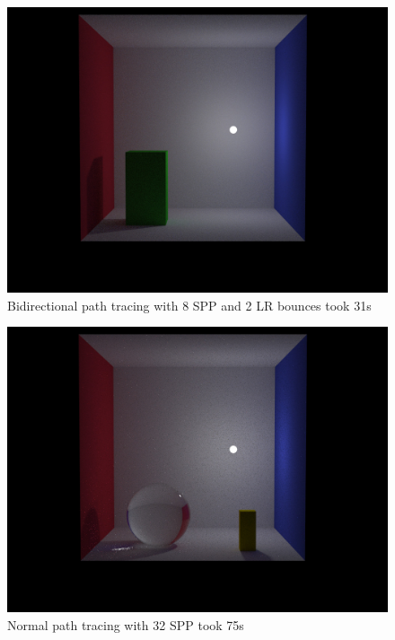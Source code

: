 \begin{figure}[htbp]
  \centering
     \includegraphics[width=\textwidth]{pics/1_bi_dir_pt_8spp_2lrb_31s.jpg}
  \caption{Bidirectional path tracing with 8 SPP and 2 LR bounces took 31s}
  \label{fig:comparison_1_bpt}
\end{figure}

\begin{figure}[htbp]
  \centering
     \includegraphics[width=\textwidth]{pics/2_normal_pt_32spp_75s.jpg}
  \caption{Normal path tracing with 32 SPP took 75s}
  \label{fig:comparison_2_npt}
\end{figure}

